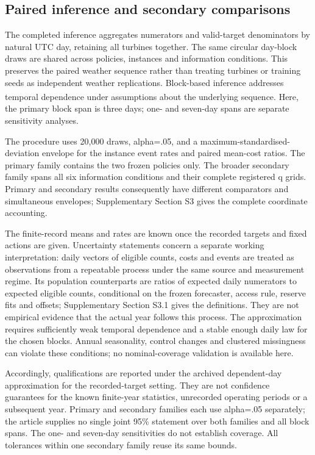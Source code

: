 \documentclass[
  british,
  11pt,
]{article}
\begin{document}
\subsection{Paired inference and secondary
comparisons}\label{paired-inference-and-secondary-comparisons}

The completed inference aggregates numerators and valid-target
denominators by natural UTC day, retaining all turbines together. The
same circular day-block draws are shared across policies, instances and
information conditions. This preserves the paired weather sequence
rather than treating turbines or training seeds as independent weather
replications. Block-based inference addresses temporal dependence under
assumptions about the underlying
sequence\textsuperscript{}. Here,
the primary block span is three days; one- and seven-day spans are
separate sensitivity analyses.

The procedure uses 20,000 draws, alpha=.05, and a
maximum-standardised-deviation envelope for the instance event rates and
paired mean-cost ratios. The primary family contains the two frozen
policies only. The broader secondary family spans all six information
conditions and their complete registered q grids. Primary and secondary
results consequently have different comparators and simultaneous
envelopes; Supplementary Section S3 gives the complete coordinate
accounting.

The finite-record means and rates are known once the recorded targets
and fixed actions are given. Uncertainty statements concern a separate
working interpretation: daily vectors of eligible counts, costs and
events are treated as observations from a repeatable process under the
same source and measurement regime. Its population counterparts are
ratios of expected daily numerators to expected eligible counts,
conditional on the frozen forecaster, access rule, reserve fits and
offsets; Supplementary Section S3.1 gives the definitions. They are not
empirical evidence that the actual year follows this process. The
approximation requires sufficiently weak temporal dependence and a
stable enough daily law for the chosen blocks. Annual seasonality,
control changes and clustered missingness can violate these conditions;
no nominal-coverage validation is available here.

Accordingly, qualifications are reported under the archived
dependent-day approximation for the recorded-target setting. They are
not confidence guarantees for the known finite-year statistics,
unrecorded operating periods or a subsequent year. Primary and secondary
families each use alpha=.05 separately; the article supplies no single
joint 95\% statement over both families and all block spans. The one-
and seven-day sensitivities do not establish coverage. All tolerances
within one secondary family reuse its same bounds.
\end{document}
